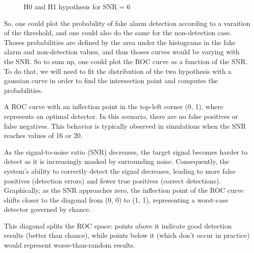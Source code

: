 \begin{figure}[h]
    \centering
	\caption{H0 and H1 hypothesis for SNR = 6}
\end{figure}


So, one could plot the probability of fake alarm detection according to a varaition of the threshold, and one could also do the same for the non-detection case. Thoses probabilities are defined by the area under the histograms in the fake alarm and non-detection values, and thus thoses curves would be varying with the SNR. So to sum up, one could plot the ROC curve as a function of the SNR. To do that, we will need to fit the distribution of the two hypothesis with a gaussian curve in order to find the intersection point and computes the probabilities.

A ROC curve with an inflection point in the top-left corner (0, 1), where represents an optimal detector. In this scenario, there are no false positives or false negatives. This behavior is typically observed in simulations when the SNR reaches values of 16 or 20.

As the signal-to-noise ratio (SNR) decreases, the target signal becomes harder to detect as it is increasingly masked by surrounding noise. Consequently, the system's ability to correctly detect the signal decreases, leading to more false positives (detection errors) and fewer true positives (correct detections). Graphically, as the SNR approaches zero, the inflection point of the ROC curve shifts closer to the diagonal from (0, 0) to (1, 1), representing a worst-case detector governed by chance.

This diagonal splits the ROC space: points above it indicate good detection results (better than chance), while points below it (which don't occur in practice) would represent worse-than-random results.

